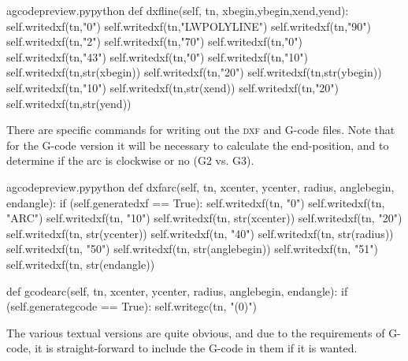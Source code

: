 \documentclass{ltxdoc}
\begin{document}
\lstset{firstnumber=\thegcpy}
\begin{writecode}{a}{gcodepreview.py}{python}
    def dxfline(self, tn, xbegin,ybegin,xend,yend):
        self.writedxf(tn,"0")
        self.writedxf(tn,"LWPOLYLINE")
        self.writedxf(tn,"90")
        self.writedxf(tn,"2")
        self.writedxf(tn,"70")
        self.writedxf(tn,"0")
        self.writedxf(tn,"43")
        self.writedxf(tn,"0")
        self.writedxf(tn,"10")
        self.writedxf(tn,str(xbegin))
        self.writedxf(tn,"20")
        self.writedxf(tn,str(ybegin))
        self.writedxf(tn,"10")
        self.writedxf(tn,str(xend))
        self.writedxf(tn,"20")
        self.writedxf(tn,str(yend))

\end{writecode}
\addtocounter{gcpy}{18}


There are specific commands for writing out the \textsc{dxf} and G-code files. Note that for the G-code version it will be necessary to calculate the end-position, and to determine if the arc is clockwise or no (G2 vs. G3).

\lstset{firstnumber=\thegcpy}
\begin{writecode}{a}{gcodepreview.py}{python}
    def dxfarc(self, tn, xcenter, ycenter, radius, anglebegin, endangle):
        if (self.generatedxf == True):
            self.writedxf(tn, "0")
            self.writedxf(tn, "ARC")
            self.writedxf(tn, "10")
            self.writedxf(tn, str(xcenter))
            self.writedxf(tn, "20")
            self.writedxf(tn, str(ycenter))
            self.writedxf(tn, "40")
            self.writedxf(tn, str(radius))
            self.writedxf(tn, "50")
            self.writedxf(tn, str(anglebegin))
            self.writedxf(tn, "51")
            self.writedxf(tn, str(endangle))

    def gcodearc(self, tn, xcenter, ycenter, radius, anglebegin, endangle):
        if (self.generategcode == True):
            self.writegc(tn, "(0)")

\end{writecode}
\addtocounter{gcpy}{19}

The various textual versions are quite obvious, and due to the requirements of G-code, it is straight-forward to include the G-code in them if it is wanted.
\end{document}
